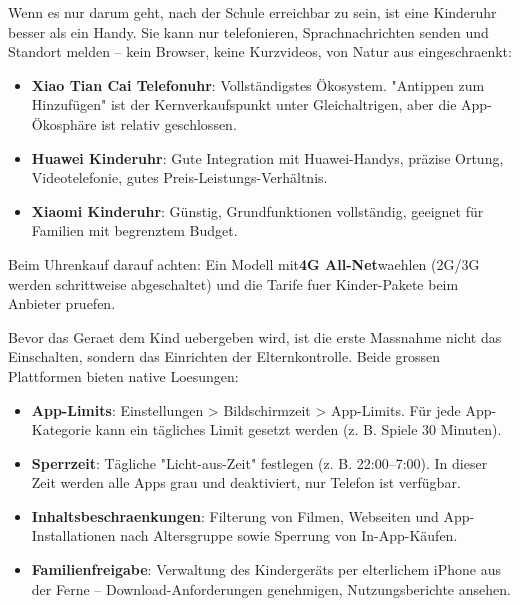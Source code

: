 Wenn es nur darum geht, nach der Schule erreichbar zu sein, ist eine Kinderuhr besser als ein Handy. Sie kann nur telefonieren, Sprachnachrichten senden und Standort melden – kein Browser, keine Kurzvideos, von Natur aus eingeschraenkt:

\begin{itemize}
  \item \textbf{Xiao Tian Cai Telefonuhr}: Vollständigstes Ökosystem. "Antippen zum Hinzufügen" ist der Kernverkaufspunkt unter Gleichaltrigen, aber die App-Ökosphäre ist relativ geschlossen.
  \item \textbf{Huawei Kinderuhr}: Gute Integration mit Huawei-Handys, präzise Ortung, Videotelefonie, gutes Preis-Leistungs-Verhältnis.
  \item \textbf{Xiaomi Kinderuhr}: Günstig, Grundfunktionen vollständig, geeignet für Familien mit begrenztem Budget.
\end{itemize}

Beim Uhrenkauf darauf achten: Ein Modell mit\textbf{4G All-Net}waehlen (2G/3G werden schrittweise abgeschaltet) und die Tarife fuer Kinder-Pakete beim Anbieter pruefen.


Bevor das Geraet dem Kind uebergeben wird, ist die erste Massnahme nicht das Einschalten, sondern das Einrichten der Elternkontrolle. Beide grossen Plattformen bieten native Loesungen:


\begin{itemize}
  \item \textbf{App-Limits}: Einstellungen > Bildschirmzeit > App-Limits. Für jede App-Kategorie kann ein tägliches Limit gesetzt werden (z. B. Spiele 30 Minuten).
  \item \textbf{Sperrzeit}: Tägliche "Licht-aus-Zeit" festlegen (z. B. 22:00–7:00). In dieser Zeit werden alle Apps grau und deaktiviert, nur Telefon ist verfügbar.
  \item \textbf{Inhaltsbeschraenkungen}: Filterung von Filmen, Webseiten und App-Installationen nach Altersgruppe sowie Sperrung von In-App-Käufen.
  \item \textbf{Familienfreigabe}: Verwaltung des Kindergeräts per elterlichem iPhone aus der Ferne – Download-Anforderungen genehmigen, Nutzungsberichte ansehen.
\end{itemize}


